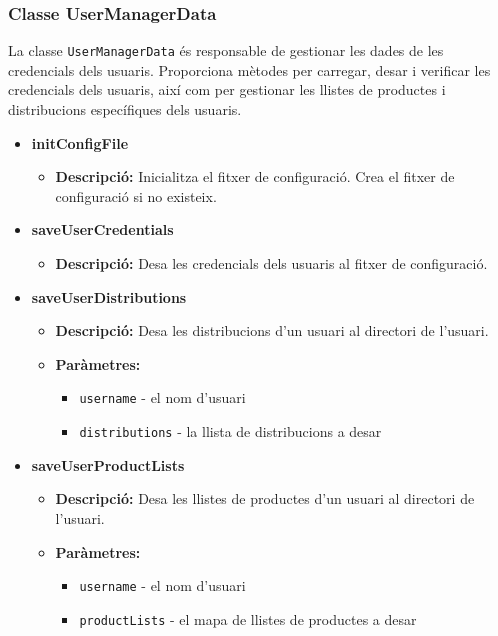 \documentclass[a4paper, t]{article}
\begin{document}
\subsubsection{Classe UserManagerData} La classe \texttt{UserManagerData} és responsable de gestionar les dades de les credencials dels usuaris. Proporciona mètodes per carregar, desar i verificar les credencials dels usuaris, així com per gestionar les llistes de productes i distribucions específiques dels usuaris.  \begin{itemize} \item \textbf{initConfigFile} \begin{itemize} \item \textbf{Descripció:} Inicialitza el fitxer de configuració. Crea el fitxer de configuració si no existeix. \end{itemize}
\item \textbf{saveUserCredentials}
\begin{itemize}
    \item \textbf{Descripció:} Desa les credencials dels usuaris al fitxer de configuració.
\end{itemize}

\item \textbf{saveUserDistributions}
\begin{itemize}
    \item \textbf{Descripció:} Desa les distribucions d'un usuari al directori de l'usuari.
    \item \textbf{Paràmetres:}
    \begin{itemize}
        \item \texttt{username} - el nom d'usuari
        \item \texttt{distributions} - la llista de distribucions a desar
    \end{itemize}
\end{itemize}

\item \textbf{saveUserProductLists}
\begin{itemize}
    \item \textbf{Descripció:} Desa les llistes de productes d'un usuari al directori de l'usuari.
    \item \textbf{Paràmetres:}
    \begin{itemize}
        \item \texttt{username} - el nom d'usuari
        \item \texttt{productLists} - el mapa de llistes de productes a desar
    \end{itemize}
\end{itemize}


\end{itemize}
\end{document}
